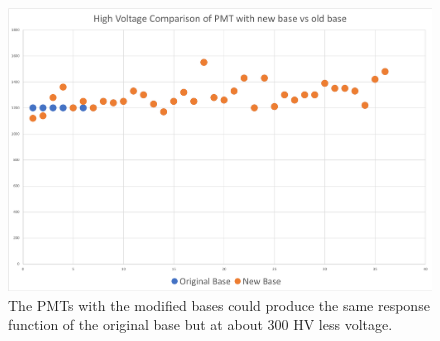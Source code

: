 \begin{figure}
	\centering
	\includegraphics[width=0.95\columnwidth,keepaspectratio]{img/pmtHVImprovement.png}
	\caption{The PMTs with the modified bases could produce the same response function of the original base but at about 300 HV less voltage.}
	\label{fig:pmtHVImprovement}
\end{figure}
